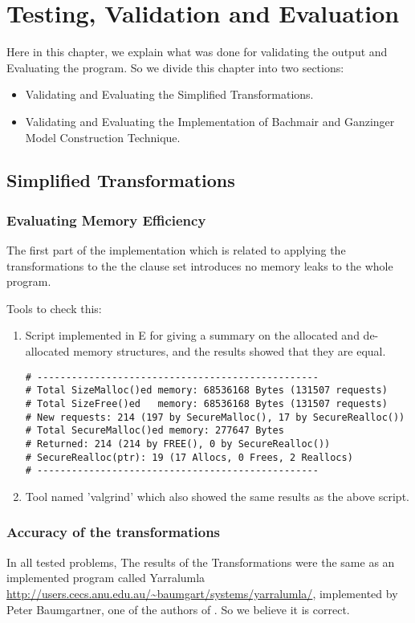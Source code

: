 \chapter{Testing, Validation and Evaluation}\label{chap:test_and_val}
Here in this chapter, we explain what was done for validating the output and Evaluating the program. So we divide this chapter into two sections:
\begin{itemize}
	\item Validating and Evaluating the Simplified Transformations.
	\item Validating and Evaluating the Implementation of Bachmair and Ganzinger Model Construction Technique.
\end{itemize} 

\section{Simplified Transformations}

\subsection{Evaluating Memory Efficiency}\label{sub:val_tran_mem}
The first part of the implementation which is related to applying the transformations to the the clause set introduces no memory leaks to the whole program.


Tools to check this:
\begin{enumerate}
	\item Script implemented in E for giving a summary on the allocated and de-allocated memory structures, and the results showed that they are equal.
		\begin{lstlisting}
# -------------------------------------------------
# Total SizeMalloc()ed memory: 68536168 Bytes (131507 requests)
# Total SizeFree()ed   memory: 68536168 Bytes (131507 requests)
# New requests: 214 (197 by SecureMalloc(), 17 by SecureRealloc())
# Total SecureMalloc()ed memory: 277647 Bytes
# Returned: 214 (214 by FREE(), 0 by SecureRealloc())
# SecureRealloc(ptr): 19 (17 Allocs, 0 Frees, 2 Reallocs)
# -------------------------------------------------
		\end{lstlisting}
	\item Tool named 'valgrind' which also showed the same results as the above script.
\end{enumerate}


\subsection{Accuracy of the transformations}
In all tested problems, The results of the Transformations were the same as an implemented program called Yarralumla \url{http://users.cecs.anu.edu.au/~baumgart/systems/yarralumla/}, implemented by Peter Baumgartner, one of the authors of \cite{BMUG06}. So we believe it is correct.


